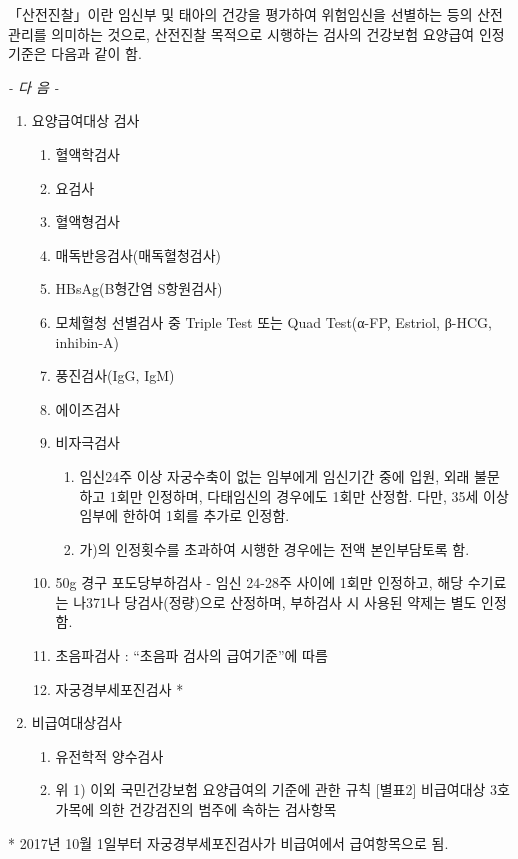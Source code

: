 {
「산전진찰」이란 임신부 및 태아의 건강을 평가하여 위험임신을 선별하는 등의 산전관리를 의미하는 것으로, 산전진찰 목적으로 시행하는 검사의 건강보험 요양급여 인정기준은 다음과 같이 함.\par
                                     \begin{center}\emph{         - 다   음 -}\end{center}
\begin{enumerate}[가.]\tightlist
\item 요양급여대상 검사
	\begin{enumerate}[1)]\tightlist
	\item 혈액학검사 
	\item 요검사
	\item 혈액형검사
	\item 매독반응검사(매독혈청검사)
	\item HBsAg(B형간염 S항원검사)
	\item 모체혈청 선별검사 중 Triple Test 또는 Quad Test(α-FP, Estriol, β-HCG, inhibin-A)
	\item 풍진검사(IgG, IgM)
	\item 에이즈검사
	\item 비자극검사
		\begin{enumerate}[가)]\tightlist
		\item 임신24주 이상 자궁수축이 없는 임부에게 임신기간 중에 입원, 외래 불문하고 1회만 인정하며, 다태임신의 경우에도 1회만 산정함. 다만, 35세 이상 임부에 한하여 1회를 추가로 인정함. 
		\item 가)의 인정횟수를 초과하여 시행한 경우에는 전액 본인부담토록 함.
		\end{enumerate} 
	\item 50g 경구 포도당부하검사
     - 임신 24-28주 사이에 1회만 인정하고, 해당 수기료는 나371나 당검사(정량)으로 산정하며, 부하검사 시 사용된 약제는 별도
       인정함.
	\item 초음파검사 :    “초음파 검사의 급여기준”에 따름
	\item 자궁경부세포진검사 *	
	\end{enumerate}
\item 비급여대상검사
	\begin{enumerate}[1)]\tightlist
	\item 유전학적 양수검사
	\item 위 1) 이외 국민건강보험 요양급여의 기준에 관한 규칙 [별표2] 비급여대상 3호 가목에 의한 건강검진의 범주에 속하는 
     검사항목
     \end{enumerate}
\end{enumerate}
* 2017년 10월 1일부터 자궁경부세포진검사가 비급여에서 급여항목으로 됨.
}%

